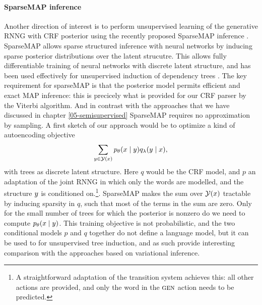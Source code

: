   \paragraph{SparseMAP inference}
    Another direction of interest is to perform unsupervised learning of the generative RNNG with CRF posterior using the recently proposed SparseMAP inference \citep{niculae2018sparsemap}. SparseMAP allows sparse structured inference with neural networks by inducing sparse posterior distributions over the latent strucutre. This allows fully differentiable training of neural networks with discrete latent structure, and has been used effectively for unsupervised induction of dependency trees \citep{niculae2018towards}. The key requirement for sparseMAP is that the posterior model permits efficient and exact MAP inference: this is precicely what is provided for our CRF parser by the Viterbi algorithm. And in contrast with the approaches that we have discussed in chapter \ref{05-semisupervised} SparseMAP requires no approximation by sampling. A first sketch of our approach would be to optimize a kind of autoencoding objective
    \begin{align*}
      \sum_{ y \in \mathcal{Y}(x) } p_{\theta}(x \mid y) q_{\lambda}( y \mid x ),
    \end{align*}
    with trees as discrete latent structure. Here $q$ would be the CRF model, and $p$ an adaptation of the joint RNNG in which only the words are modelled, and the structure $y$ is conditioned on.\footnote{A straightforward adaptation of the transition system achieves this: all other actions are provided, and only the word in the $\textsc{gen}$ action needs to be predicted.}. SparseMAP makes the sum over $\mathcal{Y}(x)$ tractable by inducing sparsity in $q$, such that most of the terms in the sum are zero. Only for the small number of trees for which the posterior is nonzero do we need to compute $p_{\theta}(x \mid y)$. This training objective is not probabilistic, and the two conditional models $p$ and $q$ together do not define a language model, but it can be used to for unsupervised tree induction, and as such provide interesting comparison with the approaches based on variational inference.
